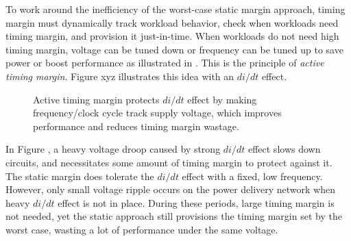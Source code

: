To work around the inefficiency of the worst-case static margin approach, timing margin must dynamically track workload behavior, check when workloads need timing margin, and provision it just-in-time. When workloads do not need high timing margin, voltage can be tuned down or frequency can be tuned up to save power or boost performance as illustrated in . This is the principle of \textit{active timing margin}. Figure xyz illustrates this idea with an $di/dt$ effect.

\begin{figure}[t!]
\captionsetup[subfloat]{width=0.4\textwidth}
\centering 
{}
\caption{Active timing margin protects $di/dt$ effect by making frequency/clock cycle track supply voltage, which improves performance and reduces timing margin wastage.}
\vspace{-0.2in}
\end{figure}

In Figure , a heavy voltage droop caused by strong $di/dt$ effect slows down circuits, and necessitates some amount of timing margin to protect against it. The static margin does tolerate the $di/dt$ effect with a fixed, low frequency. However, only small voltage ripple occurs on the power delivery network when heavy $di/dt$ effect is not in place. During these periods, large timing margin is not needed, yet the static approach still provisions the timing margin set by the worst case, wasting a lot of performance under the same voltage. 

